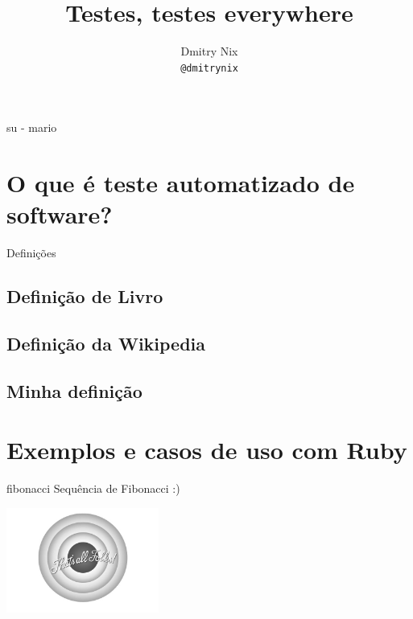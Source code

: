 \documentclass[]{beamer}
\author[Dmitry]{Dmitry Nix \\ \texttt{@dmitrynix}}
\title{Testes, testes everywhere}
\institute{ /(guru|pug-)pi/i }
\begin{document}
  \begin{frame}
    \titlepage
  \end{frame}

  \begin{frame}{su - mario}
    \tableofcontents
  \end{frame}

  \section{O que é teste automatizado de software?}

  \begin{frame}
    \begin{center}
      \Huge Definições
    \end{center}
  \end{frame}

  \subsection*{Definição de Livro}\label{def1}
  

  \subsection*{Definição da Wikipedia}
  

  \subsection*{Minha definição}
  

  \backbgcolor
  \section{Exemplos e casos de uso com Ruby}

  \begin{frame}{fibonacci}
    Sequência de Fibonacci :)
  \end{frame}

  
  

  \begin{frame}{}
    \begin{center}
      \includegraphics[width=5cm]{images/isso-e-tudo}
    \end{center}
  \end{frame}
\end{document}
